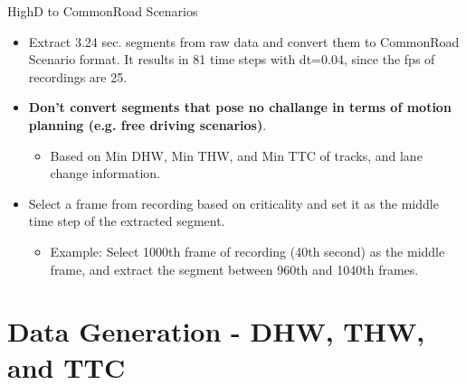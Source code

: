 \documentclass[shortpres]{beamer}
\begin{document}
\begin{frame}{HighD to CommonRoad Scenarios}	

\begin{itemize} 
\item Extract 3.24 sec. segments from raw data and convert them to CommonRoad Scenario format. It results in 81 time steps with dt=0.04, since the fps of recordings are 25.
\vfill \item \textbf{Don't convert segments that pose no challange in terms of motion planning (e.g. free driving scenarios)}.
	\begin{itemize} 
	\item Based on Min DHW, Min THW, and Min TTC of tracks, and lane change information.
	\end{itemize}
\vfill \item Select a frame from recording based on criticality and set it as the middle time step of the extracted segment.
	\begin{itemize} 
	\item Example: Select 1000th frame of recording (40th second) as the middle frame, and extract the segment between 960th and 1040th frames.
	\end{itemize}
\end{itemize}


\end{frame}

\section{Data Generation - DHW, THW, and TTC}	
\end{document}
